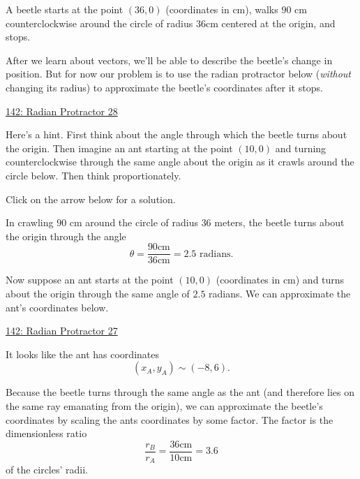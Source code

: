 \documentclass{ximera}
\begin{document}
\begin{question} \label{QBeerteee}
A beetle starts at the point $(36,0)$ (coordinates in cm), walks $90$ cm counterclockwise around the circle of radius $36$cm centered at the origin, and stops. 

After we learn about vectors, we'll be able to describe the beetle's change in position. But for now our problem is to use the radian protractor below (\emph{without} changing its radius) to approximate the beetle's coordinates after it stops.

\begin{onlineOnly}
    \begin{center}
\end{center}

\href{https://www.desmos.com/calculator/jqc8dd0iws}{142: Radian Protractor 28}

\end{onlineOnly}

\begin{hint}
Here's a hint. First think about the angle through which the beetle turns about the origin. Then imagine an ant starting at the point $(10,0)$ and turning counterclockwise through the same angle about the origin  as it crawls around the circle below. Then think proportionately.
\end{hint}

Click on the arrow below for a solution.
\begin{expandable}
In crawling $90$ cm around the circle of radius $36$ meters, the beetle turns about the origin through the angle
\[
  \theta = \frac{90 \text{cm}}{36\text{cm}} = 2.5 \text{ radians}.
\]

Now suppose an ant starts at the point $(10,0)$ (coordinates in cm) and turns about the origin through the same angle of $2.5$ radians. We can approximate the ant's coordinates below.

\begin{onlineOnly}
    \begin{center}
\end{center}

\href{https://www.desmos.com/calculator/3qwx5v0wgi}{142: Radian Protractor 27}

\end{onlineOnly}

It looks like the ant has coordinates
\[
 (x_A , y_A) \sim (-8,6).
\]

Because the beetle turns through the same angle as the ant (and therefore lies on the same ray emanating from the origin), we can approximate the beetle's coordinates by scaling the ants coordinates by some factor. The factor is the dimensionless ratio
\[
   \frac{r_B}{r_A} = \frac{36 \text{cm}}{10\text{cm}} = 3.6
\]
of the circles' radii.


\end{expandable}
\end{question}
\end{document}
